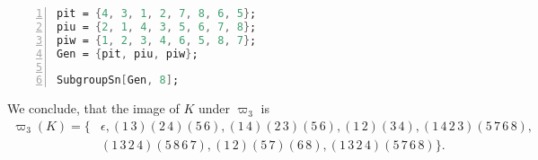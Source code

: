 \begin{lstlisting}[language=Mathematica, numbers=left, numberstyle=\tiny, stepnumber=2, numbersep=5pt]
pit = {4, 3, 1, 2, 7, 8, 6, 5};
piu = {2, 1, 4, 3, 5, 6, 7, 8};
piw = {1, 2, 3, 4, 6, 5, 8, 7};
Gen = {pit, piu, piw};

SubgroupSn[Gen, 8];
\end{lstlisting}
We conclude, that the image of $K$ under $\varpi_3$ is
\begin{align*}
\varpi_3(K)=\lbrace	&\epsilon,(1\, 3)(2\, 4)(5\, 6),    (1\, 4)(2\, 3)(5\, 6), (1\, 2)(3\, 4),   (1\, 4\, 2\, 3)(5\, 7\, 6\, 8),\\
					&(1\, 3\, 2\, 4)(5\, 8\, 6\, 7),   (1\, 2)(5\, 7)(6\, 8),   (1\, 3\, 2\, 4)(5\, 7\, 6\, 8)\rbrace.
\end{align*}